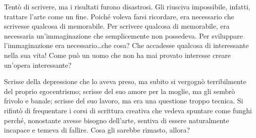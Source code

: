 \documentclass[a4paper,11pt,oneside]{memoir}
\begin{document}
Tentò di scrivere, ma i risultati furono disastrosi. Gli riusciva impossibile,
infatti, trattare l'arte come un fine. Poiché voleva farsi ricordare, era
necessario che scrivesse qualcosa di memorabile. Per scrivere qualcosa di
memorabile, era necessaria un'immaginazione che semplicemente non possedeva. Per
sviluppare l'immaginazione era necessario\dots che cosa? Che accadesse qualcosa
di interessante nella sua vita! Come può un uomo che non ha mai provato
interesse creare un'opera interessante?

Scrisse della depressione che lo aveva preso, ma subito si vergognò
terribilmente del proprio egocentrismo; scrisse del suo amore per la moglie, ma
gli sembrò frivolo e banale; scrisse del suo lavoro, ma era una questione troppo
tecnica. Si rifiutò di frequentare i corsi di scrittura creativa che vedeva
spuntare come funghi perché, nonostante avesse bisogno dell'arte, sentiva di
essere naturalmente incapace e temeva di fallire. Cosa gli sarebbe rimasto,
allora?


\end{document}
